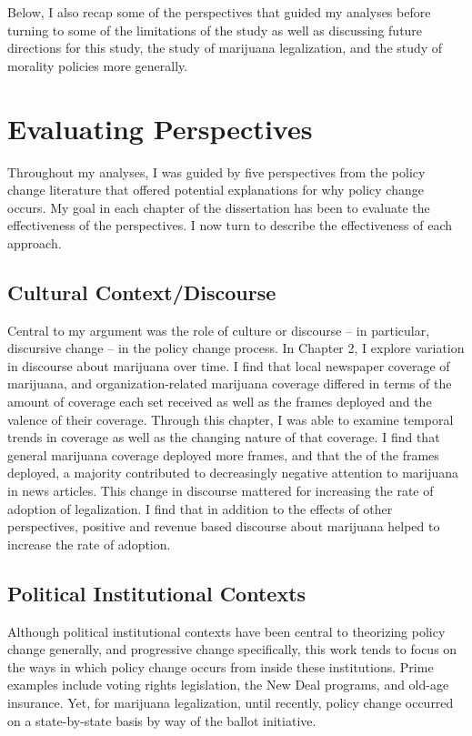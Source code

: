 Below, I also recap some of the perspectives that guided my analyses before turning to some of the limitations of the study as well as discussing future directions for this study, the study of marijuana legalization, and the study of morality policies more generally. 

\section{Evaluating Perspectives}

Throughout my analyses, I was guided by five perspectives from the policy change literature that offered potential explanations for why policy change occurs. My goal in each chapter of the dissertation has been to evaluate the effectiveness of the perspectives. I now turn to describe the effectiveness of each approach. 


\subsection{Cultural Context/Discourse}

Central to my argument was the role of culture or discourse -- in particular, discursive change -- in the policy change process. In Chapter 2, I explore variation in discourse about marijuana over time. I find that local newspaper coverage of marijuana, and organization-related marijuana coverage differed in terms of the amount of coverage each set received as well as the frames deployed and the valence of their coverage. Through this chapter, I was able to examine temporal trends in coverage as well as the changing nature of that coverage. I find that general marijuana coverage deployed more frames, and that the of the frames deployed, a majority contributed to decreasingly negative attention to marijuana in news articles. This change in discourse mattered for increasing the rate of adoption of legalization. I find that in addition to the effects of other perspectives, positive and revenue based discourse about marijuana helped to increase the rate of adoption. 


\subsection{Political Institutional Contexts}

Although political institutional contexts have been central to theorizing policy change generally, and progressive change specifically, this work tends to focus on the ways in which policy change occurs from inside these institutions. Prime examples include voting rights legislation, the New Deal programs, and old-age insurance. Yet, for marijuana legalization, until recently, policy change occurred on a state-by-state basis by way of the ballot initiative. 

